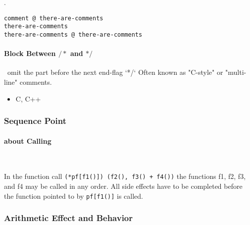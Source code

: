 .
\begin{lstlisting}[language={[x86masm]Assembler}]
comment @ there-are-comments
there-are-comments
there-are-comments @ there-are-comments
\end{lstlisting}


\paragraph{Block Between $/*$ and $*/$} \
omit the part before the next end-flag `*/`
Often known as "C-style" or "multi-line" comments.
\begin{itemize}
\item {C, C++}
\end{itemize}

\subsubsection{Sequence Point}

\paragraph{about Calling} \

In the function call \verb`(*pf[f1()]) (f2(), f3() + f4())` the functions f1, f2, f3, and f4 may be called in any order. All side effects have to be completed before the function pointed to by \verb`pf[f1()]` is called.

\subsubsection{Arithmetic Effect and Behavior}
